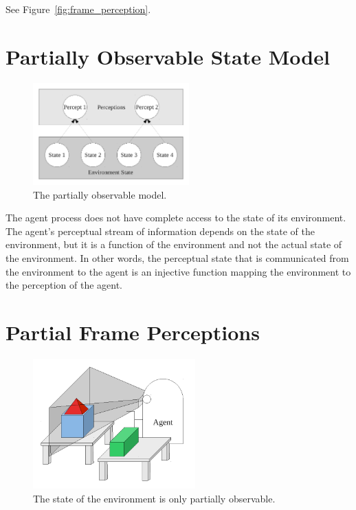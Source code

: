 See Figure~\ref{fig:frame_perception}.


\section{Partially Observable State Model}

\begin{figure}[bth]
  \center
  \includegraphics[width=6cm]{gfx/partially_observable}
  \caption[The partially observable state model]{The partially observable model.}
  \label{fig:partially_observable}
\end{figure}

The agent process does not have complete access to the state of its
environment.  The agent's perceptual stream of information depends on
the state of the environment, but it is a function of the environment
and not the actual state of the environment.  In other words, the
perceptual state that is communicated from the environment to the
agent is an injective function mapping the environment to the
perception of the agent.


\section{Partial Frame Perceptions}

\begin{figure}[bth]
  \center
  \includegraphics[height=5cm]{gfx/partial_frame_perception}
  \caption[The state of the environment is only partially observable.]{The state of the environment is only partially observable.}
  \label{fig:partial_frame_perception}
\end{figure}

